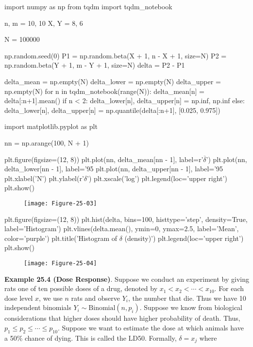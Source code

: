 \begin{python}
import numpy as np
from tqdm import tqdm_notebook

n, m = 10, 10
X, Y = 8, 6

N = 100000

np.random.seed(0)
P1 = np.random.beta(X + 1, n - X + 1, size=N)
P2 = np.random.beta(Y + 1, m - Y + 1, size=N)
delta = P2 - P1

delta_mean = np.empty(N)
delta_lower = np.empty(N)
delta_upper = np.empty(N)
for n in tqdm_notebook(range(N)):
    delta_mean[n] = delta[:n+1].mean()
    if n < 2:
        delta_lower[n], delta_upper[n] = np.inf, np.inf
    else:
        delta_lower[n], delta_upper[n] = np.quantile(delta[:n+1], [0.025, 0.975])
\end{python}

\begin{python}
import matplotlib.pyplot as plt

nn = np.arange(100, N + 1)

plt.figure(figsize=(12, 8))
plt.plot(nn, delta_mean[nn - 1], label=r'$\overline{\delta}$')
plt.plot(nn, delta_lower[nn - 1], label='95%
plt.plot(nn, delta_upper[nn - 1], label='95%
plt.xlabel('N')
plt.ylabel(r'$\delta$')
plt.xscale('log')
plt.legend(loc='upper right')
plt.show()
\end{python}

\begin{figure}[H]
\texttt{[image: Figure-25-03]}
\end{figure}

\begin{python}
plt.figure(figsize=(12, 8))
plt.hist(delta, bins=100, histtype='step', density=True, label='Histogram')
plt.vlines(delta.mean(), ymin=0, ymax=2.5, label='Mean', color='purple')
plt.title('Histogram of $\delta$ (density)')
plt.legend(loc='upper right')
plt.show()
\end{python}

\begin{figure}[H]
\texttt{[image: Figure-25-04]}
\end{figure}

\textbf{Example 25.4 (Dose Response)}. Suppose we conduct an experiment
by giving rats one of ten possible doses of a drug, denoted by
\(x_1 < x_2 < \cdots < x_{10}\). For each dose level \(x\), we use \(n\)
rats and observe \(Y_i\), the number that die. Thus we have 10
independent binomials \(Y_i \sim \text{Binomial}(n, p_i)\). Suppose we
know from biological considerations that higher doses should have higher
probability of death. Thus, \(p_1 \leq p_2 \leq \cdots \leq p_{10}\).
Suppose we want to estimate the dose at which animals have a 50\% chance
of dying. This is called the LD50. Formally, \(\delta = x_j\) where

